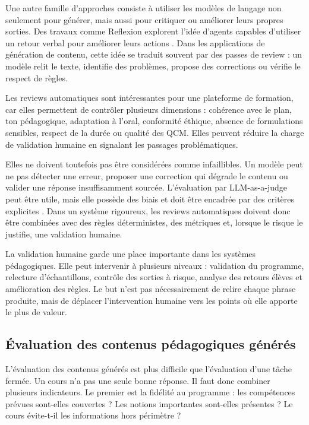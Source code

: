 Une autre famille d'approches consiste à utiliser les modèles de langage non seulement
pour générer, mais aussi pour critiquer ou améliorer leurs propres sorties. Des travaux
comme Reflexion explorent l'idée d'agents capables d'utiliser un retour verbal pour
améliorer leurs actions \cite{shinn2023reflexion}. Dans les applications de génération de
contenu, cette idée se traduit souvent par des passes de review : un modèle relit le texte,
identifie des problèmes, propose des corrections ou vérifie le respect de règles.

Les reviews automatiques sont intéressantes pour une plateforme de formation, car elles
permettent de contrôler plusieurs dimensions : cohérence avec le plan, ton pédagogique,
adaptation à l'oral, conformité éthique, absence de formulations sensibles, respect de la
durée ou qualité des QCM. Elles peuvent réduire la charge de validation humaine en
signalant les passages problématiques.

Elles ne doivent toutefois pas être considérées comme infaillibles. Un modèle peut ne pas
détecter une erreur, proposer une correction qui dégrade le contenu ou valider une
réponse insuffisamment sourcée. L'évaluation par LLM-as-a-judge peut être utile, mais
elle possède des biais et doit être encadrée par des critères explicites \cite{zheng2023judging}.
Dans un système rigoureux, les reviews automatiques doivent donc être combinées avec
des règles déterministes, des métriques et, lorsque le risque le justifie, une validation
humaine.

La validation humaine garde une place importante dans les systèmes pédagogiques. Elle
peut intervenir à plusieurs niveaux : validation du programme, relecture d'échantillons,
contrôle des sorties à risque, analyse des retours élèves et amélioration des règles. Le
but n'est pas nécessairement de relire chaque phrase produite, mais de déplacer
l'intervention humaine vers les points où elle apporte le plus de valeur.

\subsection{Évaluation des contenus pédagogiques générés}

L'évaluation des contenus générés est plus difficile que l'évaluation d'une tâche fermée.
Un cours n'a pas une seule bonne réponse. Il faut donc combiner plusieurs indicateurs.
Le premier est la fidélité au programme : les compétences prévues sont-elles couvertes ?
Les notions importantes sont-elles présentes ? Le cours évite-t-il les informations hors
périmètre ?

